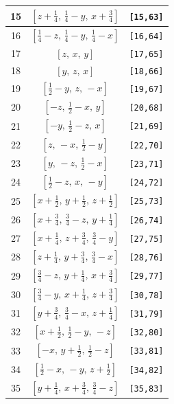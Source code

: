\documentclass[fleqn,8pt]{jsarticle}
\begin{document}
\begin{longtable}{ccc}
15 & $\left[ z + \frac{1}{4},\, \frac{1}{4} - y,\, x + \frac{3}{4} \right]$ & {\tt [15,63]} \\ \hline
16 & $\left[ \frac{1}{4} - z,\, \frac{1}{4} - y,\, \frac{1}{4} - x \right]$ & {\tt [16,64]} \\ \hline
17 & $\left[ z,\, x,\, y \right]$ & {\tt [17,65]} \\ \hline
18 & $\left[ y,\, z,\, x \right]$ & {\tt [18,66]} \\ \hline
19 & $\left[ \frac{1}{2} - y,\, z,\, - x \right]$ & {\tt [19,67]} \\ \hline
20 & $\left[ - z,\, \frac{1}{2} - x,\, y \right]$ & {\tt [20,68]} \\ \hline
21 & $\left[ - y,\, \frac{1}{2} - z,\, x \right]$ & {\tt [21,69]} \\ \hline
22 & $\left[ z,\, - x,\, \frac{1}{2} - y \right]$ & {\tt [22,70]} \\ \hline
23 & $\left[ y,\, - z,\, \frac{1}{2} - x \right]$ & {\tt [23,71]} \\ \hline
24 & $\left[ \frac{1}{2} - z,\, x,\, - y \right]$ & {\tt [24,72]} \\ \hline
25 & $\left[ x + \frac{1}{2},\, y + \frac{1}{2},\, z + \frac{1}{2} \right]$ & {\tt [25,73]} \\ \hline
26 & $\left[ x + \frac{3}{4},\, \frac{3}{4} - z,\, y + \frac{1}{4} \right]$ & {\tt [26,74]} \\ \hline
27 & $\left[ x + \frac{1}{4},\, z + \frac{3}{4},\, \frac{3}{4} - y \right]$ & {\tt [27,75]} \\ \hline
28 & $\left[ z + \frac{1}{4},\, y + \frac{3}{4},\, \frac{3}{4} - x \right]$ & {\tt [28,76]} \\ \hline
29 & $\left[ \frac{3}{4} - z,\, y + \frac{1}{4},\, x + \frac{3}{4} \right]$ & {\tt [29,77]} \\ \hline
30 & $\left[ \frac{3}{4} - y,\, x + \frac{1}{4},\, z + \frac{3}{4} \right]$ & {\tt [30,78]} \\ \hline
31 & $\left[ y + \frac{3}{4},\, \frac{3}{4} - x,\, z + \frac{1}{4} \right]$ & {\tt [31,79]} \\ \hline
32 & $\left[ x + \frac{1}{2},\, \frac{1}{2} - y,\, - z \right]$ & {\tt [32,80]} \\ \hline
33 & $\left[ - x,\, y + \frac{1}{2},\, \frac{1}{2} - z \right]$ & {\tt [33,81]} \\ \hline
34 & $\left[ \frac{1}{2} - x,\, - y,\, z + \frac{1}{2} \right]$ & {\tt [34,82]} \\ \hline
35 & $\left[ y + \frac{1}{4},\, x + \frac{3}{4},\, \frac{3}{4} - z \right]$ & {\tt [35,83]} \\ \hline

\end{longtable}
\end{document}
